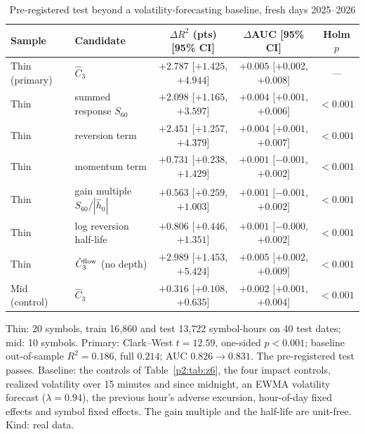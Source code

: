\begin{table}[t]\centering
\begin{threeparttable}
\caption{Pre-registered test beyond a volatility-forecasting baseline, fresh days 2025--2026}\label{p2:tab:z9}
\small\setlength{\tabcolsep}{2.5pt}
\begin{tabular}{lp{}ccc}
\toprule
Sample & Candidate & $\Delta R^2$ (pts) [95\% CI] & $\Delta$AUC [95\% CI] & Holm $p$\\
\midrule
Thin (primary) & $\hat C_3$ & $+2.787$ [$+1.425$, $+4.944$] & $+0.005$ [$+0.002$, $+0.008$] & ---\\
Thin & summed response $S_{60}$ & $+2.098$ [$+1.165$, $+3.597$] & $+0.004$ [$+0.001$, $+0.006$] & $<0.001$\\
Thin & reversion term & $+2.451$ [$+1.257$, $+4.379$] & $+0.004$ [$+0.001$, $+0.007$] & $<0.001$\\
Thin & momentum term & $+0.731$ [$+0.238$, $+1.429$] & $+0.001$ [$-0.001$, $+0.002$] & $<0.001$\\
Thin & gain multiple $S_{60}/|\hat h_0|$ & $+0.563$ [$+0.259$, $+1.003$] & $+0.001$ [$-0.001$, $+0.002$] & $<0.001$\\
Thin & log reversion half-life & $+0.806$ [$+0.446$, $+1.351$] & $+0.001$ [$-0.000$, $+0.002$] & $<0.001$\\
Thin & $\hat C_3^{\rm flow}$ (no depth) & $+2.989$ [$+1.453$, $+5.424$] & $+0.005$ [$+0.002$, $+0.009$] & $<0.001$\\
Mid (control) & $\hat C_3$ & $+0.316$ [$+0.108$, $+0.635$] & $+0.002$ [$+0.001$, $+0.004$] & $<0.001$\\
\bottomrule
\end{tabular}
\begin{tablenotes}\footnotesize\item Thin: 20 symbols, train 16{,}860 and test 13{,}722 symbol-hours on 40 test dates; mid: 10 symbols. Primary: Clark--West $t=12.59$, one-sided $p<0.001$; baseline out-of-sample $R^2=0.186$, full $0.214$; AUC $0.826\to0.831$. The pre-registered test passes. Baseline: the controls of Table~\ref{p2:tab:z6}, the four impact controls, realized volatility over 15 minutes and since midnight, an EWMA volatility forecast ($\lambda=0.94$), the previous hour's adverse excursion, hour-of-day fixed effects and symbol fixed effects. The gain multiple and the half-life are unit-free. Kind: real data.\end{tablenotes}
\end{threeparttable}
\end{table}

